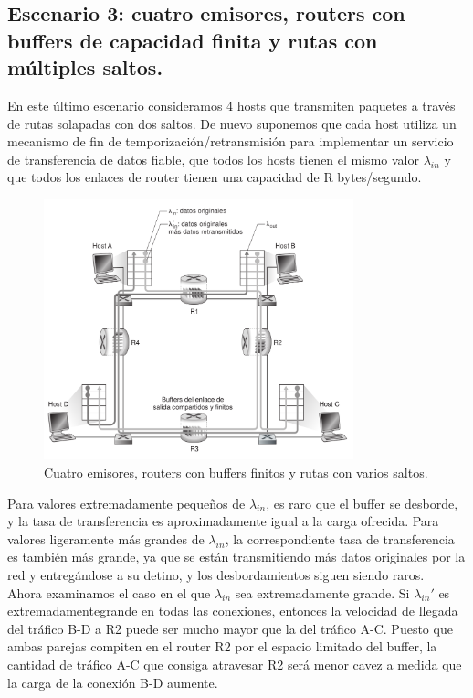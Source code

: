 \documentclass[a4paper,11pt]{article}
\begin{document}
\subsection{Escenario 3: cuatro emisores, routers con buffers de capacidad finita y rutas con múltiples saltos.}
En este último escenario consideramos 4 hosts que transmiten paquetes a través de rutas solapadas con dos saltos. De nuevo suponemos que cada host utiliza un mecanismo de fin de temporización/retransmisión para implementar un servicio de transferencia de datos fiable, que todos los hosts tienen el mismo valor $\lambda_{in}$ y que todos los enlaces de router tienen una capacidad de R bytes/segundo.

\begin{figure}[h]
\centering
\caption{Cuatro emisores, routers con buffers finitos y rutas con varios saltos.}
\includegraphics[scale=1,width=0.8\textwidth]{escenario_3.png}
\end{figure}

Para valores extremadamente pequeños de $\lambda_{in}$, es raro que el buffer se desborde, y la tasa de transferencia es aproximadamente igual a la carga ofrecida. Para valores ligeramente más grandes de $\lambda_{in}$, la correspondiente tasa de transferencia es también más grande, ya que se están transmitiendo más datos originales por la red y entregándose a su detino, y los desbordamientos siguen siendo raros. \\

Ahora examinamos el caso en el que $\lambda_{in}$ sea extremadamente grande. Si $\lambda_{in}'$ es extremadamentegrande en todas las conexiones, entonces la velocidad de llegada del tráfico B-D a R2 puede ser mucho mayor que la del tráfico A-C. Puesto que ambas parejas compiten en el router R2 por el espacio limitado del buffer, la cantidad de tráfico A-C que consiga atravesar R2 será menor cavez a medida que la carga de la conexión B-D aumente. \\
\end{document}
